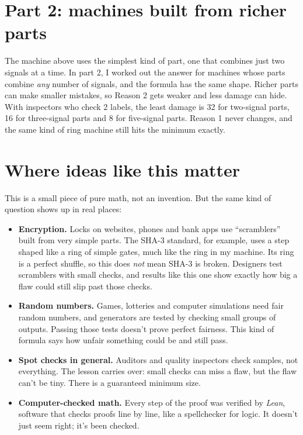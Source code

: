 \documentclass[11pt]{article}
\begin{document}
\section*{Part 2: machines built from richer parts}

The machine above uses the simplest kind of part, one that combines just two
signals at a time. In part 2, I worked out the answer for machines whose parts
combine \emph{any} number of signals, and the formula has the same shape. Richer
parts can make smaller mistakes, so Reason 2 gets weaker and less damage can hide.
With inspectors who check 2 labels, the least damage is 32 for two-signal parts,
16 for three-signal parts and 8 for five-signal parts. Reason 1 never changes,
and the same kind of ring machine still hits the minimum exactly.

\section*{Where ideas like this matter}

This is a small piece of pure math, not an invention. But the same kind of
question shows up in real places:

\begin{itemize}[leftmargin=1.4em, itemsep=4pt]
\item \textbf{Encryption.} Locks on websites, phones and bank apps use
``scramblers'' built from very simple parts. The SHA-3 standard, for
example, uses a step shaped like a ring of simple gates, much like the ring
in my machine. Its ring is a perfect shuffle, so this does \emph{not} mean
SHA-3 is broken. Designers test scramblers with small checks, and results
like this one show exactly how big a flaw could still slip past those checks.
\item \textbf{Random numbers.} Games, lotteries and computer simulations need
fair random numbers, and generators are tested by checking small groups of
outputs. Passing those tests doesn't prove perfect fairness. This kind of
formula says how unfair something could be and still pass.
\item \textbf{Spot checks in general.} Auditors and quality inspectors check
samples, not everything. The lesson carries over: small checks can miss a
flaw, but the flaw can't be tiny. There is a guaranteed minimum size.
\item \textbf{Computer-checked math.} Every step of the proof was verified by
\emph{Lean}, software that checks proofs line by line, like a spellchecker
for logic. It doesn't just seem right; it's been checked.
\end{itemize}
\end{document}
